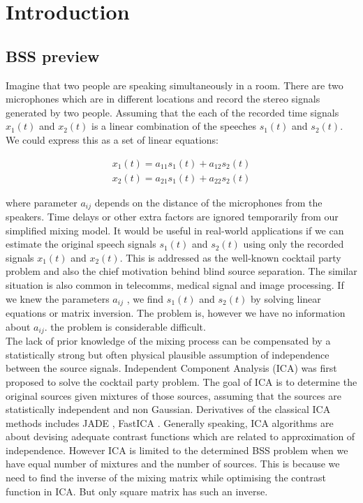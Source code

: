 \section{Introduction} \label{intro}
\subsection{BSS preview}
Imagine that two people are speaking simultaneously in a room. There are two microphones which are in different locations and record the stereo signals generated by two people. Assuming that the each of the recorded time signals $x_1(t)$ and $x_2(t)$ is a linear combination of the speeches $s_1(t)$ and $s_2(t)$. We could express this as a set of linear equations:

\begin{align}
    x_1(t) = a_{11}s_1(t) + a_{12}s_2(t)\\
    x_2(t) = a_{21}s_1(t) + a_{22}s_2(t)
\end{align}

where parameter $a_{ij}$ depends on the distance of the microphones from the speakers. Time delays or other extra factors are ignored temporarily from our simplified mixing model. It would be useful in real-world applications if we can estimate the original speech signals $s_1(t)$ and $s_2(t)$ using only the recorded signals $x_1(t)$ and $x_2(t)$. This is addressed as the well-known cocktail party problem and also the chief motivation behind blind source separation. The similar situation is also common in telecomms, medical signal and image processing. If we knew the parameters $a_{ij}$ , we find $s_1(t)$ and $s_2(t)$  by solving linear equations or matrix inversion. The problem is, however we have no information about $a_{ij}$. the problem is considerable difficult.\\

The lack of prior knowledge of the mixing process can be compensated by a statistically strong but often physical plausible assumption of independence between the source signals. Independent Component Analysis (ICA) was first proposed to solve the cocktail party problem. The goal of ICA is to determine the original sources given mixtures of those sources, assuming that the sources are statistically independent and non Gaussian. Derivatives of the classical ICA methods includes JADE \cite{JADE720250}, FastICA \cite{fastICA777510}. Generally speaking, ICA algorithms are about devising adequate contrast functions which are related to approximation of independence\cite{HYVARINEN2000411}. However ICA is limited to the determined BSS problem when we have equal number of mixtures and the number of sources. This is because we need to find the inverse of the mixing matrix while optimising the contrast function in ICA. But only square matrix has such an inverse. 


